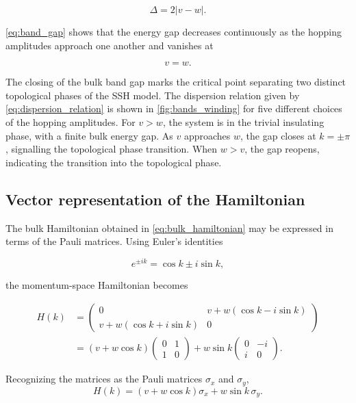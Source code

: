 \documentclass[11pt, a4paper]{article}
\begin{document}
\begin{equation}
\Delta = 2|v-w|.
\label{eq:band_gap}
\end{equation}

\cref{eq:band_gap} shows that the energy gap decreases continuously as the hopping amplitudes approach one another and vanishes at

\begin{equation*}
v=w.
\end{equation*}

The closing of the bulk band gap marks the critical point separating two distinct topological phases of the SSH model.
The dispersion relation given by \cref{eq:dispersion_relation} is shown in \cref{fig:bands_winding} for five different choices of the hopping amplitudes.
For $v>w$, the system is in the trivial insulating phase, with a finite bulk energy gap.
As $v$ approaches $w$, the gap closes at $k=\pm\pi$, signalling the topological phase transition.
When $w>v$, the gap reopens, indicating the transition into the topological phase.

\subsection{Vector representation of the Hamiltonian}
The bulk Hamiltonian obtained in \cref{eq:bulk_hamiltonian} may be expressed in terms of the Pauli matrices.
Using Euler's identities 

\begin{equation*} 
e^{\pm ik}=\cos k \pm i\sin k, 
\end{equation*} 

the momentum-space Hamiltonian becomes 

\begin{align*} 
H(k) &= \begin{pmatrix} 0 & v+w(\cos k-i\sin k)\\ v+w(\cos k+i\sin k) & 0 \end{pmatrix} \\ &= (v+w\cos k) \begin{pmatrix} 0&1\\ 1&0 \end{pmatrix} + w\sin k \begin{pmatrix} 0&-i\\ i&0 \end{pmatrix}.
\end{align*} 

Recognizing the matrices as the Pauli matrices \(\sigma_x\) and \(\sigma_y\), 
\begin{equation} 
    H(k) = (v+w\cos k)\sigma_x + w\sin k\,\sigma_y.
\label{eq:pauli_hamiltonian} 
\end{equation} 
\end{document}
